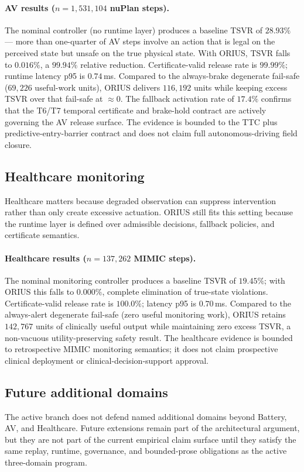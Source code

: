 \paragraph{AV results ($n = 1{,}531{,}104$ nuPlan steps).}
The nominal controller (no runtime layer) produces a baseline TSVR of
$\mathbf{28.93\%}$ --- more than one-quarter of AV steps involve an action that
is legal on the perceived state but unsafe on the true physical state.
With ORIUS, TSVR falls to $\mathbf{0.016\%}$, a $99.94\%$ relative reduction.
Certificate-valid release rate is $99.99\%$; runtime latency p95 is $0.74$\,ms.
Compared to the always-brake degenerate fail-safe ($69{,}226$ useful-work units),
ORIUS delivers $116{,}192$ units while keeping excess TSVR over that fail-safe
at $\approx 0$.  The fallback activation rate of $17.4\%$ confirms that the
T6/T7 temporal certificate and brake-hold contract are actively governing the
AV release surface.  The evidence is bounded to the TTC plus predictive-entry-barrier
contract and does not claim full autonomous-driving field closure.


\subsection{Healthcare monitoring}
Healthcare matters because degraded observation can suppress intervention rather than
only create excessive actuation.  ORIUS still fits this setting because the runtime layer
is defined over admissible decisions, fallback policies, and certificate semantics.

\paragraph{Healthcare results ($n = 137{,}262$ MIMIC steps).}
The nominal monitoring controller produces a baseline TSVR of $\mathbf{19.45\%}$;
with ORIUS this falls to $\mathbf{0.000\%}$, complete elimination of true-state
violations.  Certificate-valid release rate is $100.0\%$; latency p95 is $0.70$\,ms.
Compared to the always-alert degenerate fail-safe (zero useful monitoring work),
ORIUS retains $142{,}767$ units of clinically useful output while maintaining zero
excess TSVR, a non-vacuous utility-preserving safety result.  The healthcare evidence
is bounded to retrospective MIMIC monitoring semantics; it does not claim prospective
clinical deployment or clinical-decision-support approval.

\subsection{Future additional domains}
The active branch does not defend named additional domains beyond Battery, AV, and
Healthcare. Future extensions remain part of the architectural argument, but they are
not part of the current empirical claim surface until they satisfy the same replay,
runtime, governance, and bounded-prose obligations as the active three-domain program.
